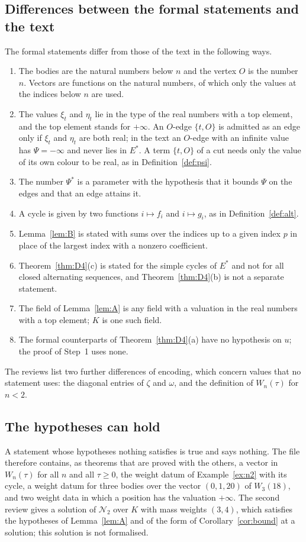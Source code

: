 \documentclass[11pt]{amsart}
\theoremstyle{definition}
\theoremstyle{remark}
\numberwithin{equation}{section}
\newcommand{\repo}[1]{\texttt{\detokenize{#1}}}
\newcommand{\cN}{\mathcal{N}}
\newcommand{\Ps}{\Psi^{*}}
\newcommand{\Es}{E^{*}}
\begin{document}
\subsection*{Differences between the formal statements and the text} The formal statements differ from
those of the text in the following ways.
\begin{enumerate}
\item The bodies are the natural numbers below $n$ and the vertex $O$ is the number $n$. Vectors are
functions on the natural numbers, of which only the values at the indices below $n$ are used.
\item The values $\xi_t$ and $\eta_t$ lie in the type of the real numbers with a top element, and the
top element stands for $+\infty$. An $O$-edge $\{t, O\}$ is admitted as an edge only if $\xi_t$ and
$\eta_t$ are both real; in the text an $O$-edge with an infinite value has $\Psi = -\infty$ and never
lies in $\Es$. A term
$\{t, O\}$ of a cut needs only the value of its own colour to be real, as in
Definition~\ref{def:psi}.
\item The number $\Ps$ is a parameter with the hypothesis that it bounds $\Psi$ on the edges and that
an edge attains it.
\item A cycle is given by two functions $i \mapsto f_i$ and $i \mapsto g_i$, as in
Definition~\ref{def:alt}.
\item Lemma~\ref{lem:B} is stated with sums over the indices up to a given index $p$ in place of the
largest index with a nonzero coefficient.
\item Theorem~\ref{thm:D4}(c) is stated for the simple cycles of $\Es$ and not for all closed
alternating sequences, and Theorem~\ref{thm:D4}(b) is not a separate statement.
\item The field of Lemma~\ref{lem:A} is any field with a valuation in the real numbers with a top
element; $K$ is one such field.
\item The formal counterparts of Theorem~\ref{thm:D4}(a) have no hypothesis on $u$; the proof of
Step~1 uses none.
\end{enumerate}
The reviews list two further differences of encoding, which concern values that no statement uses:
the diagonal entries of $\zeta$ and $\omega$, and the definition of $W_n(\tau)$ for $n < 2$.

\subsection*{The hypotheses can hold} A statement whose hypotheses nothing satisfies is true and says
nothing. The file \repo{Challenge.lean} therefore contains, as theorems that are proved with the
others, a vector in $W_n(\tau)$ for all $n$ and all $\tau \ge 0$, the weight datum of Example~\ref{ex:n2} with its
cycle, a weight datum for three bodies over the vector $(0, 1, 20)$ of $W_3(18)$, and two weight data in
which a position has the valuation $+\infty$. The second review gives a solution of $\cN_2$ over $K$
with mass weights $(3, 4)$, which satisfies the hypotheses of Lemma~\ref{lem:A} and of the form
of Corollary~\ref{cor:bound} at a solution; this solution is not formalised.
\end{document}
